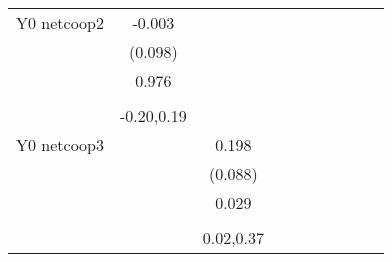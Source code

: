 \begin{table}[!h]
\begin{adjustbox}{width=\columnwidth,center}
\begin{tabular}{l*{8}{c}}
Y0 netcoop2         &      -0.003         &                     &                     &                     &                     &                     &                     &                     &                     &                     \\
                    &     (0.098)         &                     &                     &                     &                     &                     &                     &                     &                     &                     \\
                    &       0.976         &                     &                     &                     &                     &                     &                     &                     &                     &                     \\
                    &                     &                     &                     &                     &                     &                     &                     &                     &                     &                     \\
                    &  -0.20,0.19         &                     &                     &                     &                     &                     &                     &                     &                     &                     \\
Y0 netcoop3         &                     &       0.198\sym{**} &                     &                     &                     &                     &                     &                     &                     &                     \\
                    &                     &     (0.088)         &                     &                     &                     &                     &                     &                     &                     &                     \\
                    &                     &       0.029         &                     &                     &                     &                     &                     &                     &                     &                     \\
                    &                     &                     &                     &                     &                     &                     &                     &                     &                     &                     \\
                    &                     &   0.02,0.37         &                     &                     &                     &                     &                     &                     &                     &                     \\

\end{tabular}
\end{adjustbox}
\end{table}
